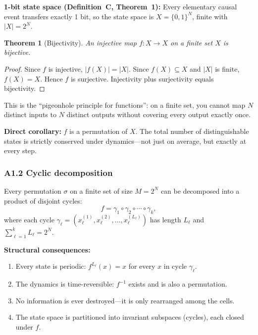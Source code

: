 \documentclass[reprint]{revtex4-2}
\newtheorem{theorem}{Theorem}
\begin{document}
\textbf{1-bit state space (Definition~C, Theorem~1):} Every elementary causal event transfers exactly 1 bit, so the state space is $X=\{0,1\}^N$, finite with $|X|=2^N$.

\begin{theorem}[Bijectivity]
\label{thm:bijectivity}
An injective map $f:X\to X$ on a finite set $X$ is bijective.
\end{theorem}

\begin{proof}
Since $f$ is injective, $|f(X)| = |X|$. Since $f(X)\subseteq X$ and $|X|$ is finite, $f(X)=X$. Hence $f$ is surjective. Injectivity plus surjectivity equals bijectivity.
\end{proof}

This is the ``pigeonhole principle for functions'': on a finite set, you cannot map $N$ distinct inputs to $N$ distinct outputs without covering every output exactly once.

\textbf{Direct corollary:} $f$ is a permutation of $X$. The total number of distinguishable states is strictly conserved under dynamics---not just on average, but exactly at every step.

\subsubsection{A1.2 Cyclic decomposition}

Every permutation $\sigma$ on a finite set of size $M=2^N$ can be decomposed into a product of disjoint cycles:
\begin{equation}
f = \gamma_1 \circ \gamma_2 \circ \cdots \circ \gamma_k,
\end{equation}
where each cycle $\gamma_\ell = (x_\ell^{(1)}, x_\ell^{(2)}, \ldots, x_\ell^{(L_\ell)})$ has length $L_\ell$ and $\sum_{\ell=1}^k L_\ell = 2^N$.

\textbf{Structural consequences:}
\begin{enumerate}[label=(\roman*)]
\item Every state is periodic: $f^{L_\ell}(x) = x$ for every $x$ in cycle $\gamma_\ell$.
\item The dynamics is time-reversible: $f^{-1}$ exists and is also a permutation.
\item No information is ever destroyed---it is only rearranged among the cells.
\item The state space is partitioned into invariant subspaces (cycles), each closed under $f$.
\end{enumerate}
\end{document}
